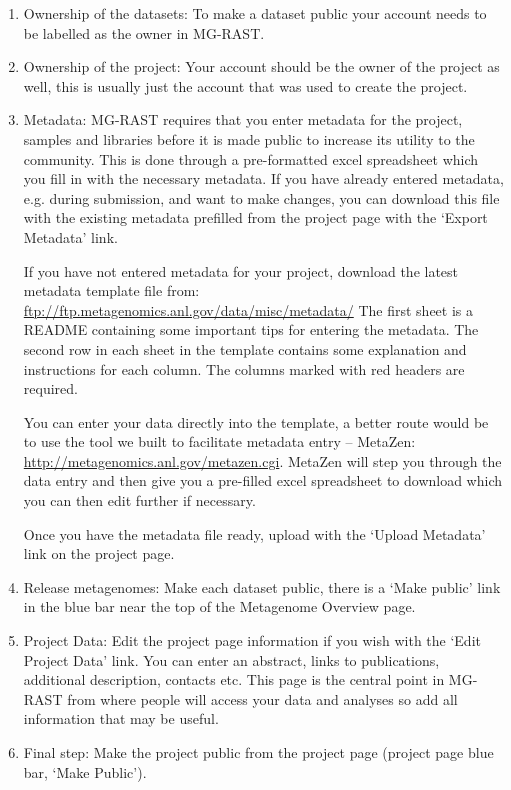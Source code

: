 \documentclass[12pt,fullpage]{report}
\begin{document}
\begin{enumerate}
\item 
Ownership of the datasets: To make a dataset public your account needs to be labelled as the owner in MG-RAST.
\item
Ownership of the project: Your account should be the owner of the project as well, this is usually just the account that was used to create the project.
\item
Metadata: MG-RAST requires that you enter metadata for the project, samples and libraries before it is made public to increase its utility to the community. This is done through a pre-formatted excel spreadsheet which you fill in with the necessary metadata.
If you have already entered metadata, e.g. during submission, and want to make changes, you can download this file with the existing metadata prefilled from the project page with the `Export Metadata' link.

If you have not entered metadata for your project, download the latest metadata template file from:
\url{ftp://ftp.metagenomics.anl.gov/data/misc/metadata/}
The first sheet is a README containing some important tips for entering the metadata. The second row in each sheet in the template contains some explanation and instructions for each column. The columns marked with red headers are required.

You can enter your data directly into the template, a better route would be to use the tool we built to facilitate metadata entry -- MetaZen: \url{http://metagenomics.anl.gov/metazen.cgi}.
MetaZen will step you through the data entry and then give you a pre-filled excel spreadsheet to download which you can then edit further if necessary.

Once you have the metadata file ready, upload with the `Upload Metadata' link on the project page.
\item
Release metagenomes: Make each dataset public, there is a `Make public' link in the blue bar near the top of the Metagenome Overview page.
\item
Project Data: Edit the project page information if you wish with the `Edit Project Data' link. You can enter an abstract, links to publications, additional description, contacts etc. This page is the central point in MG-RAST from where people will access your data and analyses so add all information that may be useful.
\item
Final step: Make the project public from the project page (project page blue bar, `Make Public').
\end{enumerate}
\end{document}
